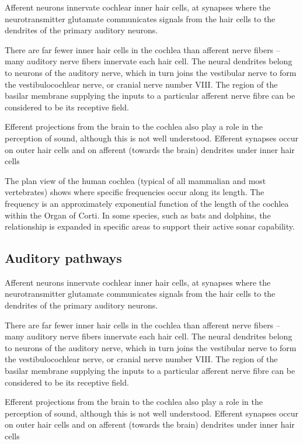 \documentclass[]{book}
\begin{document}
Afferent neurons innervate cochlear inner hair cells, at synapses where the neurotransmitter glutamate communicates signals from the hair cells to the dendrites of the primary auditory neurons.

There are far fewer inner hair cells in the cochlea than afferent nerve fibers -- many auditory nerve fibers innervate each hair cell. The neural dendrites belong to neurons of the auditory nerve, which in turn joins the vestibular nerve to form the vestibulocochlear nerve, or cranial nerve number VIII. The region of the basilar membrane supplying the inputs to a particular afferent nerve fibre can be considered to be its receptive field.

Efferent projections from the brain to the cochlea also play a role in the perception of sound, although this is not well understood. Efferent synapses occur on outer hair cells and on afferent (towards the brain) dendrites under inner hair cells

The plan view of the human cochlea (typical of all mammalian and most vertebrates) shows where specific frequencies occur along its length. The frequency is an approximately exponential function of the length of the cochlea within the Organ of Corti. In some species, such as bats and dolphins, the relationship is expanded in specific areas to support their active sonar capability.

\hypertarget{auditory-pathways}{%
\subsection{Auditory pathways}\label{auditory-pathways}}

Afferent neurons innervate cochlear inner hair cells, at synapses where the neurotransmitter glutamate communicates signals from the hair cells to the dendrites of the primary auditory neurons.

There are far fewer inner hair cells in the cochlea than afferent nerve fibers -- many auditory nerve fibers innervate each hair cell. The neural dendrites belong to neurons of the auditory nerve, which in turn joins the vestibular nerve to form the vestibulocochlear nerve, or cranial nerve number VIII. The region of the basilar membrane supplying the inputs to a particular afferent nerve fibre can be considered to be its receptive field.

Efferent projections from the brain to the cochlea also play a role in the perception of sound, although this is not well understood. Efferent synapses occur on outer hair cells and on afferent (towards the brain) dendrites under inner hair cells
\end{document}
